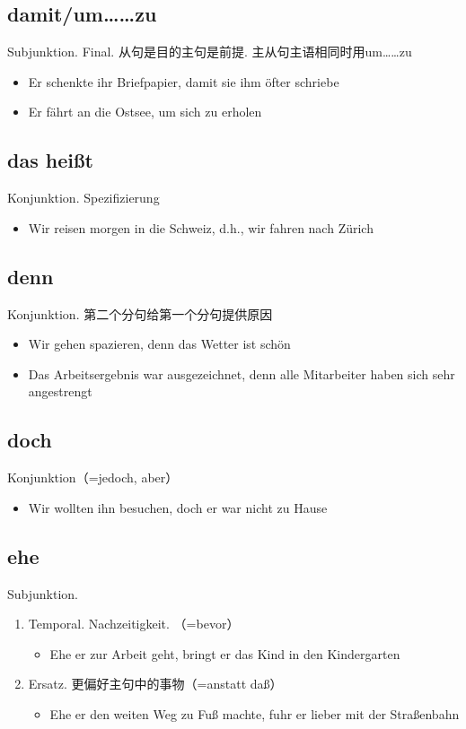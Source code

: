 \documentclass[UTF8]{report}
\begin{document}
\subsection{damit/um……zu}
Subjunktion. Final. 从句是目的主句是前提. 主从句主语相同时用um……zu
\begin{itemize}
    \item Er schenkte ihr Briefpapier, damit sie ihm öfter schriebe
    \item Er fährt an die Ostsee, um sich zu erholen
\end{itemize}

\subsection{das heißt}
Konjunktion. Spezifizierung
\begin{itemize}
    \item Wir reisen morgen in die Schweiz, d.h., wir fahren nach Zürich
\end{itemize}

\subsection{denn}
Konjunktion. 第二个分句给第一个分句提供原因
\begin{itemize}
    \item Wir gehen spazieren, denn das Wetter ist schön
    \item Das Arbeitsergebnis war ausgezeichnet, denn alle Mitarbeiter haben sich sehr angestrengt
\end{itemize}

\subsection{doch}
Konjunktion（=jedoch, aber）
\begin{itemize}
    \item Wir wollten ihn besuchen, doch er war nicht zu Hause
\end{itemize}

\subsection{ehe}
Subjunktion. 
\begin{enumerate}
    \item Temporal. Nachzeitigkeit. （=bevor）
    \begin{itemize}
        \item Ehe er zur Arbeit geht, bringt er das Kind in den Kindergarten
    \end{itemize}
    \item Ersatz. 更偏好主句中的事物（=anstatt daß）
    \begin{itemize}
        \item Ehe er den weiten Weg zu Fuß machte, fuhr er lieber mit der Straßenbahn
    \end{itemize}
\end{enumerate}
\end{document}
